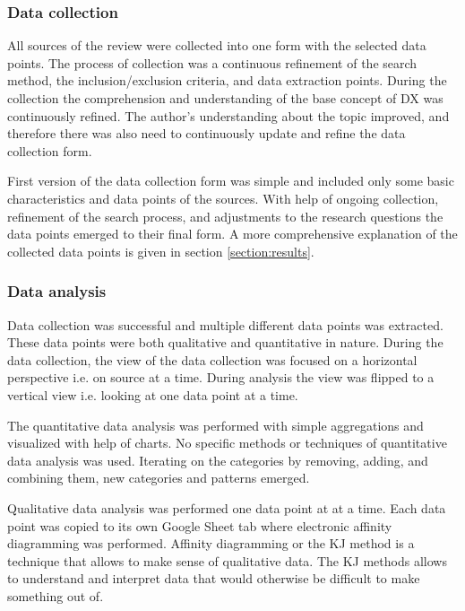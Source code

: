 \documentclass[english, 12pt, a4paper, sci, utf8, a-1b, online]{aaltothesis}
\begin{document}
\subsubsection{Data collection}

All sources of the review were collected into one form with the selected data points. The process of collection was a continuous refinement of the search method, the inclusion/exclusion criteria, and data extraction points. During the collection the comprehension and understanding of the base concept of DX was continuously refined. The author's understanding about the topic improved, and therefore there was also need to continuously update and refine the data collection form.

First version of the data collection form was simple and included only some basic characteristics and data points of the sources. With help of ongoing collection, refinement of the search process, and adjustments to the research questions the data points emerged to their final form. A more comprehensive explanation of the collected data points is given in section \ref{section:results}.

\subsubsection{Data analysis}

Data collection was successful and multiple different data points was extracted. These data points were both qualitative and quantitative in nature. During the data collection, the view of the data collection was focused on a horizontal perspective i.e. on source at a time. During analysis the view was flipped to a vertical view i.e. looking at one data point at a time.

The quantitative data analysis was performed with simple aggregations and visualized with help of charts. No specific methods or techniques of quantitative data analysis was used. Iterating on the categories by removing, adding, and combining them, new categories and patterns emerged.

Qualitative data analysis was performed one data point at at a time. Each data point was copied to its own Google Sheet tab where electronic affinity diagramming was performed. Affinity diagramming or the KJ method \parencite{scupin1997kj} is a technique that allows to make sense of qualitative data. The KJ methods allows to understand and interpret data that would otherwise be difficult to make something out of.
\end{document}
